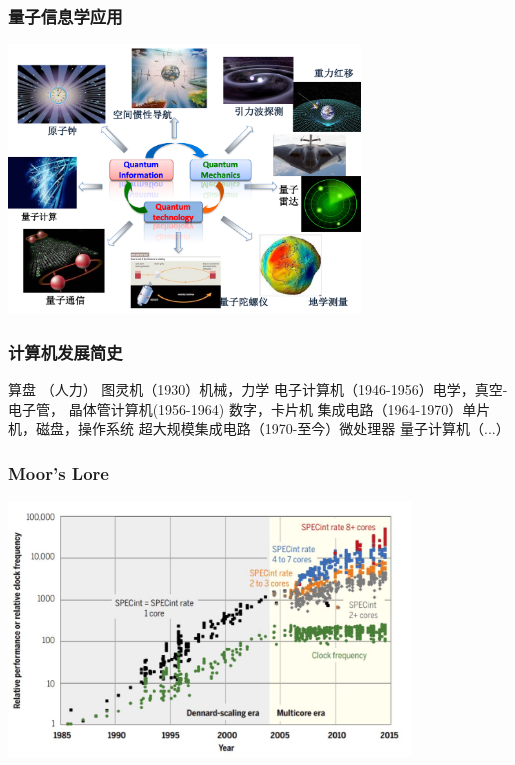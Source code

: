 \begin{frame} 
    \frametitle{量子信息学应用}
    \begin{center}
        \includegraphics[width=0.7\textwidth]{figs/2.png}
    \end{center}   
\end{frame}

\begin{frame} 
    \frametitle{计算机发展简史}
    \begin{enumerate}
        \Item   算盘 （人力）
        \Item   图灵机（1930）机械，力学
        \Item   电子计算机（1946-1956）电学，真空-电子管，
        \Item   晶体管计算机(1956-1964) 数字，卡片机
        \Item   集成电路（1964-1970）单片机，磁盘，操作系统
        \Item   超大规模集成电路（1970-至今）微处理器
        \Item   量子计算机（...）
    \end{enumerate}
\end{frame}

\begin{frame} 
    \frametitle{Moor's Lore}
    \begin{center}
        \includegraphics[width=0.8\textwidth]{figs/3.png}
    \end{center} 
\end{frame}

